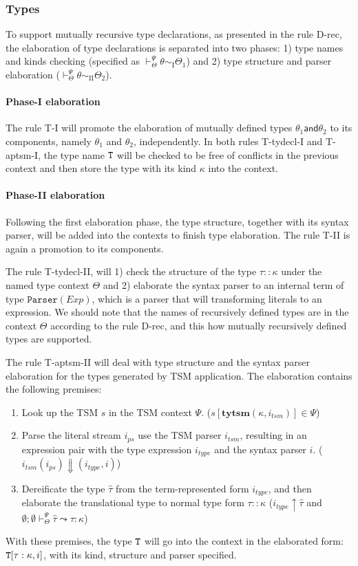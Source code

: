 \subsubsection{Types}
To support mutually recursive type declarations, as presented in the rule D-rec, the elaboration of type declarations is separated into two phases: 1) type names and kinds checking (specified as $\vdash_{\Theta}^{\Psi}\theta\sim_{\mathrm{I}}\Theta_1$) and 2) type structure and parser elaboration ($\vdash_{\Theta}^{\Psi}\theta\sim_{\mathrm{II}}\Theta_2$). 

\paragraph{Phase-I elaboration} The rule T-I will promote the elaboration of mutually defined types $\theta_1 \mathsf{and} \theta_2$ to its components, namely $\theta_1$ and $\theta_2$, independently.  In both rules T-tydecl-I and T-aptsm-I, the type name $\mathtt{T}$ will be checked to be free of conflicts in the previous context and then store the type with its kind $\kappa$ into the context.

\paragraph{Phase-II elaboration}
Following the first elaboration phase, the type structure, together with its syntax parser, will be added into the contexts to finish type elaboration. The rule T-II is again a promotion to its components. 

The rule T-tydecl-II, will 1) check the structure of the type $\tau::\kappa$ under the named type context $\Theta$ and 2) elaborate the syntax parser to an internal term of type $\mathtt{Parser}(Exp)$, which is a parser that will transforming literals to an expression. We should note that the names of recursively defined types are in the context $\Theta$ according to the rule D-rec, and this how mutually recursively defined types are supported.

The rule T-aptsm-II will deal with type structure and the syntax parser elaboration for the types generated by TSM application. The elaboration contains the following premises:
\begin{enumerate}
\item Look up the TSM $s$ in the TSM context $\Psi$. ($s[\mathbf{tytsm}(\kappa,i_{tsm})]\in\Psi$)
\item Parse the literal stream $i_{ps}$ use the TSM parser $i_{tsm}$, resulting in an expression pair with the type expression $i_{type}$ and the syntax parser $i$. ($i_{tsm}(i_{ps})\Downarrow (i_{type},i)$)
\item Dereificate the type $\hat\tau$ from the term-represented form $i_{type}$, and then elaborate the translational type to normal type form $\tau::\kappa$ ($i_{type}\uparrow\hat\tau$ and $\emptyset;\emptyset\vdash^{\Psi}_{\Theta}\hat\tau\leadsto\tau:\kappa$)
\end{enumerate}
With these premises, the type $\mathtt{T}$ will go into the context in the elaborated form: $\mathtt{T}[\tau:\kappa,i]$, with its kind, structure and parser specified.

